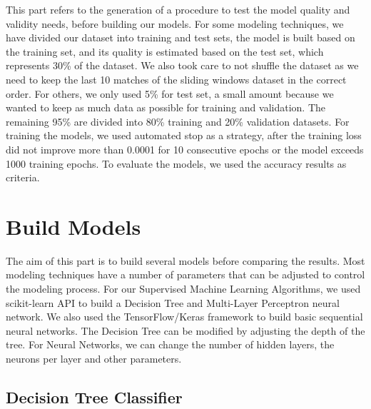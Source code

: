 This part refers to the generation of a procedure to test the model quality and validity needs, before building our models. \newline \newline
For some modeling techniques, we have divided our dataset into training and test sets, the model is built based on the training set, and its quality is estimated based on the test set, which represents 30\% of the dataset. \newline
We also took care to not shuffle the dataset as we need to keep the last 10 matches of the sliding windows dataset in the correct order. \newline 
For others, we only used 5\% for test set, a small amount because we wanted to keep as much data as possible for training and validation. The remaining 95\% are divided into 80\% training and 20\% validation datasets.\newline \newline
For training the models, we used automated stop as a strategy, after the training loss did not improve more than 0.0001 for 10 consecutive epochs or the model exceeds 1000 training epochs.\newline \newline
To evaluate the models, we used the accuracy results as criteria.


\section{Build Models}

The aim of this part is to build several models before comparing the results.\newline
Most modeling techniques have a number of parameters that can be adjusted to control the modeling process.\newline \newline
For our Supervised Machine Learning Algorithms, we used scikit-learn API to build a Decision Tree and Multi-Layer Perceptron neural network. We also used the TensorFlow/Keras framework to build basic sequential neural networks.\newline \newline
The Decision Tree can be modified by adjusting the depth of the tree. For Neural Networks, we can change the number of hidden layers, the neurons per layer and other parameters.


\subsection{Decision Tree Classifier}

